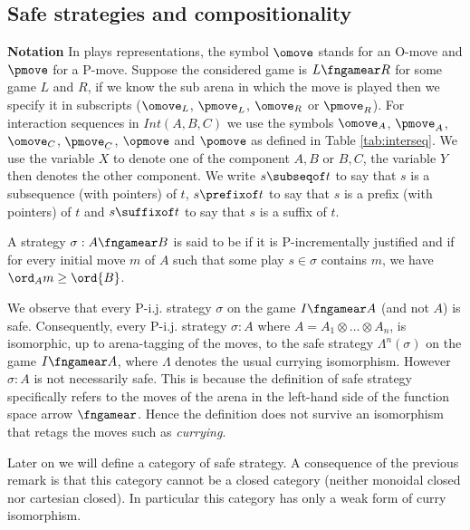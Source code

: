 \subsection{Safe strategies and compositionality}
{\bf Notation} In plays representations,
the symbol $\omove$ stands for an
O-move and $\pmove$ for
a P-move. 
Suppose the considered game is $L\fngamear R$ 
for some game $L$ and $R$, if we know the sub arena in which the move is played
then we specify it in subscripts ($\omove_L$, $\pmove_L$, $\omove_R$ or $\pmove_R$). For interaction sequences in $Int(A,B,C)$ we use
the symbols $\omove_A$, $\pmove_A$, $\omove_C$, $\pmove_C$, $\opmove$ and $\pomove$ as defined in Table \ref{tab:interseq}. We use the variable $X$ to denote one of the component $A,B$ or $B,C$, the variable  $Y$
then denotes the other component.
We write $s \subseqof t$ to say that $s$ is a subsequence (with pointers) of $t$, $s \prefixof t$ to say that $s$ is a prefix (with pointers)
of $t$ and  $s \suffixof t$ to say that $s$ is a suffix of $t$.

\begin{definition}
\label{def:safe_strategy}
A strategy $\sigma : A \fngamear B$ is said to be  if 
it is P-incrementally justified and if for
every initial move $m$ of $A$ such that some play $s\in\sigma$ contains $m$, we have $\ord_A{m} \geq \ord{B}$. 
\end{definition}
We observe that every P-i.j. strategy $\sigma$ on the game $I \fngamear A$ (and not $A$) is safe.
Consequently, every P-i.j. strategy $\sigma : A$ where $A = A_1 \otimes \ldots \otimes A_n$, is isomorphic, up to arena-tagging of the moves, to the safe strategy $\Lambda^n(\sigma)$ on the game $I \fngamear A$, where $\Lambda$ denotes the usual currying isomorphism. 
However $\sigma : A$ is not necessarily safe. This is because 
the definition of safe strategy specifically refers to the moves of  the arena in the left-hand side of the function space arrow $\fngamear$. Hence the definition does not survive an isomorphism
that retags the moves such as {\it currying}.

Later on we will define a category of safe strategy. A consequence of the previous remark is that this category cannot be a closed category (neither monoidal closed nor cartesian closed).
In particular this category has only a weak form of curry isomorphism.


